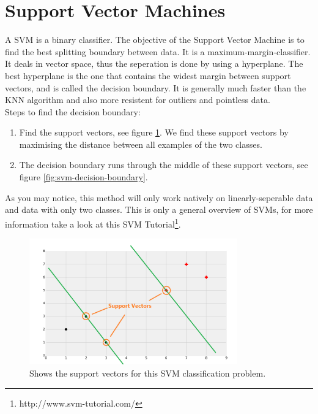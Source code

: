 \section{Support Vector Machines}
A SVM is a binary classifier. The objective of the Support Vector Machine is to find the best splitting boundary between data. It is a maximum-margin-classifier. It deals in vector space, thus the seperation is done by using a hyperplane. The best hyperplane is the one that contains the widest margin between support vectors, and is called the decision boundary. It is generally much faster than the KNN algorithm and also more resistent for outliers and pointless data.
\\
\noindent Steps to find the decision boundary:
\begin{enumerate}
\item Find the support vectors, see figure \ref{fig:svm-support-vectors}. We find these support vectors by maximising the distance between all examples of the two classes.
\item The decision boundary runs through the middle of these support vectors, see figure \ref{fig:svm-decision-boundary}.
\end{enumerate}

As you may notice, this method will only work natively on linearly-seperable data and data with only two classes. %
This is only a general overview of SVMs, for more information take a look at this SVM Tutorial\footnote{http://www.svm-tutorial.com/}.


\begin{figure}
\centering
\includegraphics[width=0.8\textwidth]{images/svm-support-vectors.png}
\caption{\label{fig:svm-support-vectors} Shows the support vectors for this SVM classification problem.}
\end{figure}

